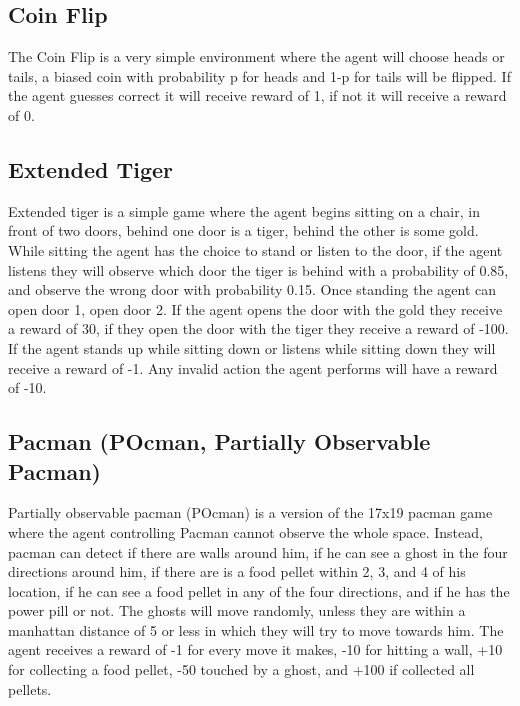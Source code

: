 \documentclass{article}
\theoremstyle{definition}
\newtheorem{primary statistics}[definition]{Primary Statistics}
\newtheorem{auxiliary statistics}[definition]{Auxiliary Statistics}
\begin{document}
\subsection{Coin Flip}
The Coin Flip is a very simple environment where the agent will choose heads or tails, a biased coin with probability p for heads and 1-p for tails will be flipped. If the agent guesses correct it will receive reward of 1, if not it will receive a reward of 0.

\subsection{Extended Tiger}
Extended tiger is a simple game where the agent begins sitting on a chair, in front of two doors, behind one door is a tiger, behind the other is some gold. While sitting the agent has the choice to stand or listen to the door, if the agent listens they will observe which door the tiger is behind with a probability of 0.85, and observe the wrong door with probability 0.15. Once standing the agent can open door 1, open door 2. If the agent opens the door with the gold they receive a reward of 30, if they open the door with the tiger they receive a reward of -100. If the agent stands up while sitting down or listens while sitting down they will receive a reward of -1. Any invalid action the agent performs will have a reward of -10.

\subsection{Pacman (POcman, Partially Observable Pacman)}
Partially observable pacman (POcman) is a version of the 17x19 pacman game where the agent controlling Pacman cannot observe the whole space. Instead, pacman can detect if there are walls around him, if he can see a ghost in the four directions around him, if there are is a food pellet within 2, 3, and 4 of his location, if he can see a food pellet in any of the four directions, and if he has the power pill or not. The ghosts will move randomly, unless they are within a manhattan distance of 5 or less in which they will try to move towards him. The agent receives a reward of -1 for every move it makes, -10 for hitting a wall, +10 for collecting a food pellet, -50 touched by a ghost, and +100 if collected all pellets.
\end{document}
